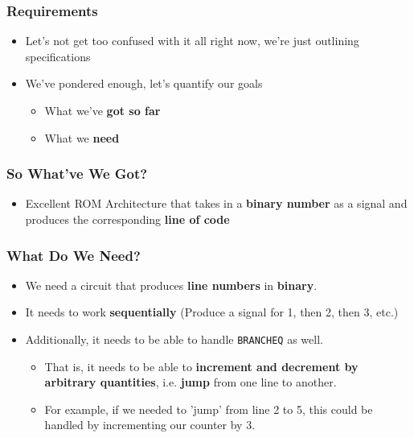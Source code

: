 \documentclass{beamer}
\begin{document}
    	\begin{frame}
    		\frametitle{Requirements}
    		\begin{itemize}
    			\item Let's not get too confused with it all right now, we're just outlining specifications
    			\item We've pondered enough, let's quantify our goals
    			\begin{itemize}
    				\item What we've \textbf{got so far}
    				\item What we \textbf{need}
    			\end{itemize}
    			
    		\end{itemize}
    	\end{frame}
    	
    	\begin{frame}
    		\frametitle{So What've We Got?}
    		\begin{itemize}
    			\item Excellent ROM Architecture that takes in a \textbf{binary number} as a signal and produces the corresponding \textbf{line of code}
    		\end{itemize}
    	\end{frame}
    	
    	\begin{frame}
    		\frametitle{What Do We Need?}
    		\begin{itemize}
    			\item We need a circuit that produces \textbf{line numbers} in \textbf{binary}.
    			\item It needs to work \textbf{sequentially} (Produce a signal for 1, then 2, then 3, etc.)
    			\item Additionally, it needs to be able to handle \texttt{BRANCHEQ} as well.
    			\begin{itemize}
    				\item That is, it needs to be able to \textbf{increment and decrement by arbitrary quantities}, i.e. \textbf{jump} from one line to another.
    				\item For example, if we needed to 'jump' from line 2 to 5, this could be handled by incrementing our counter by 3.
    			\end{itemize}
    		\end{itemize}
    	\end{frame}
    		     	
\end{document}
